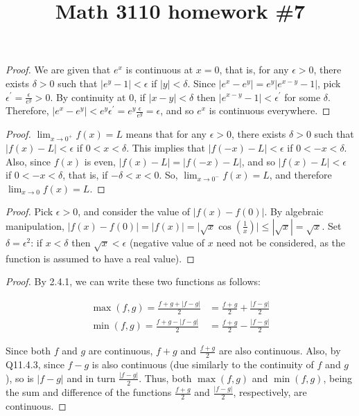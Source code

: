 

\title{Math 3110 homework \#7}
\author{\name}
\maketitle

\begin{proof}
  We are given that $e^x$ is continuous at $x = 0$, that is, for any $\epsilon > 0$, there exists $\delta > 0$ such that $|e^y - 1| < \epsilon$ if $|y| < \delta$. Since $|e^x - e^y| = e^y|e^{x - y} - 1|$, pick $\epsilon^{\prime} = \frac{\epsilon}{e^y} > 0$. By continuity at 0, if $|x - y| < \delta$ then $|e^{x - y} - 1| < \epsilon^{\prime}$ for some $\delta$. Therefore, $|e^x - e^y| < e^y \epsilon^{\prime} = e^y \frac{\epsilon}{e^y} = \epsilon$, and so $e^x$ is continuous everywhere.
\end{proof}

\begin{proof}
  $\lim_{x \rightarrow 0^+} f(x) = L$ means that for any $\epsilon > 0$, there exists $\delta > 0$ such that $|f(x) - L| < \epsilon$ if $0 < x < \delta$. This implies that $|f(-x) - L| < \epsilon$ if $0 < -x < \delta$. Also, since $f(x)$ is even, $|f(x) - L| = |f(-x) - L|$, and so $|f(x) - L| < \epsilon$ if $0 < -x < \delta$, that is, if $-\delta < x < 0$. So, $\lim_{x \rightarrow 0^-} f(x) = L$, and therefore $\lim_{x \rightarrow 0} f(x) = L$.
\end{proof}

\begin{proof}
  Pick $\epsilon > 0$, and consider the value of $|f(x) - f(0)|$. By algebraic manipulation, $|f(x) - f(0)| = |f(x)| = \Big|\sqrt{x} \cos\left(\frac{1}{x}\right)\Big| \leq |\sqrt{x}| = \sqrt{x}$. Set $\delta = \epsilon^2$: if $x < \delta$ then $\sqrt{x} < \epsilon$ (negative value of $x$ need not be considered, as the function is assumed to have a real value).
\end{proof}

\begin{proof}
  By 2.4.1, we can write these two functions as follows:

  \begin{align*}
    \max(f, g) = \frac{f + g + |f - g|}{2} &= \frac{f + g}{2} + \frac{|f - g|}{2} \\
    \min(f, g) = \frac{f + g - |f - g|}{2} &= \frac{f + g}{2} - \frac{|f - g|}{2}
  \end{align*}

  Since both $f$ and $g$ are continuous, $f + g$ and $\frac{f + g}{2}$ are also continuous. Also, by Q11.4.3, since $f - g$ is also continuous (due similarly to the continuity of $f$ and $g$), so is $|f - g|$ and in turn $\frac{|f - g|}{2}$. Thus, both $\max(f, g)$ and $\min(f, g)$, being the sum and difference of the functions $\frac{f + g}{2}$ and $\frac{|f - g|}{2}$, respectively, are continuous.
\end{proof}

